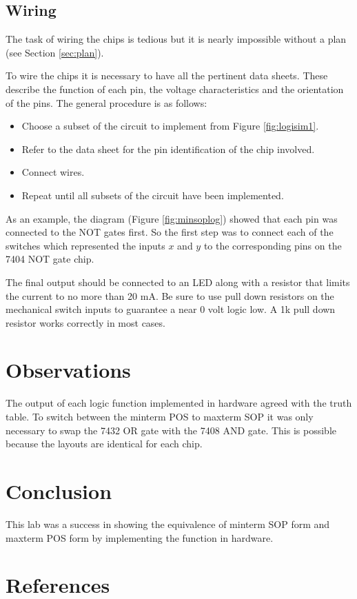 \documentclass[12pt]{article}
\begin{document}
\clearpage

\subsection{Wiring}

The task of wiring the chips is tedious but it is nearly impossible
without a plan (see Section \ref{sec:plan}).

To wire the chips it is necessary to have all the pertinent data sheets.
These describe the function of each pin, the voltage characteristics and
the orientation of the pins.
The general procedure is as follows:
\begin{itemize}
	\item Choose a subset of the circuit to implement from Figure \ref{fig:logisim1}.
	\item Refer to the data sheet for the pin identification of the chip involved.
	\item Connect wires.
	\item Repeat until all subsets of the circuit have been implemented.
\end{itemize}

As an example, the diagram (Figure \ref{fig:minsoplog}) showed that
each pin was connected to the NOT gates first.
So the first step was to connect each of the switches which represented
the inputs $x$ and $y$ to the corresponding pins on the 7404 NOT gate chip.

The final output should be connected to an LED along with a resistor
that limits the current to no more than 20 mA.
Be sure to use pull down resistors on the mechanical switch inputs to
guarantee a near 0 volt logic low.
A 1k pull down resistor works correctly in most cases.


\section{Observations}

The output of each logic function implemented in hardware agreed
with the truth table.
To switch between the minterm POS to maxterm SOP it was only
necessary to swap the 7432 OR gate with the 7408 AND gate.
This is possible because the layouts are identical for each chip.

\clearpage
\section{Conclusion}

This lab was a success in showing the equivalence of minterm SOP
form and maxterm POS form by implementing the function in hardware.


\renewcommand*{\refname}{\vspace{-8mm}}
\section{References}
%
%



\end{document}
